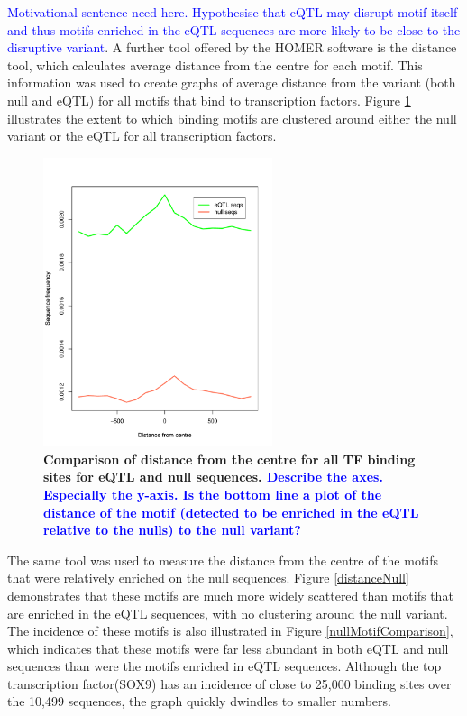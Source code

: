 \documentclass[12pt]{article}
\begin{document}
\textcolor{blue}{Motivational sentence need here. Hypothesise that eQTL may disrupt motif itself and thus motifs enriched in the eQTL sequences are more likely to be close to the disruptive variant}. A further tool offered by the HOMER software is the distance tool, which calculates average distance from the centre for each motif. This information was used to create graphs of average distance from the variant (both null and eQTL) for all motifs that bind to transcription factors. Figure \ref{distance} illustrates the extent to which binding motifs are clustered around either the null variant or the eQTL for all transcription factors.

\begin{figure}[!htbp]
\centering
\includegraphics[width= 0.6\textwidth]{RplotEQTLandNullSequencesCompared.pdf} 
\caption{\bf{Comparison of distance from the centre for all TF binding sites for eQTL and null sequences. \textcolor{blue}{Describe the axes. Especially the y-axis. Is the bottom line a plot of the distance of the motif (detected to be enriched in the eQTL relative to the nulls) to the null variant?}}}
\label{distance}
\end{figure}

The same tool was used to measure the distance from the centre of the motifs that were relatively enriched on the null sequences. Figure \ref{distanceNull} demonstrates that these motifs are much more widely scattered than motifs that are enriched in the eQTL sequences, with no clustering around the null variant. The incidence of these motifs is also illustrated in Figure \ref{nullMotifComparison}, which indicates that these motifs were far less abundant in both eQTL and null sequences than were the motifs enriched in eQTL sequences. Although the top transcription factor(SOX9) has an incidence of close to 25,000 binding sites over the 10,499 sequences, the graph quickly dwindles to smaller numbers.
\end{document}
